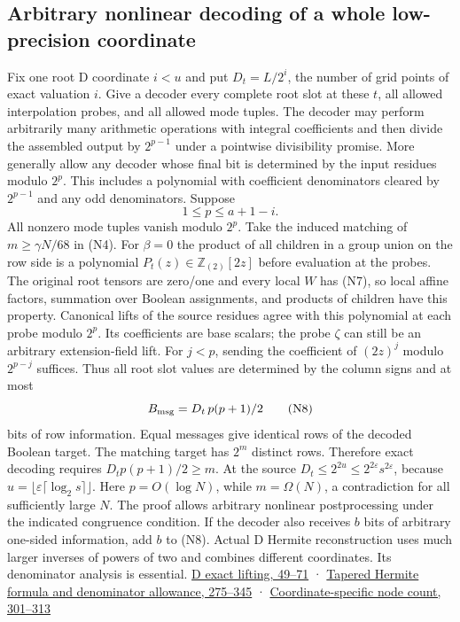 \documentclass[11pt,a4paper]{article}
\begin{document}
\subsection{Arbitrary nonlinear decoding of a whole low-precision
coordinate}\label{v8-arbitrary-nonlinear-decoding-of-a-whole-low-precision-coordinate}

Fix one root D coordinate \(i<u\) and put \(D_t=L/2^i\), the number of
grid points of exact valuation \(i\). Give a decoder every complete root
slot at these \(t\), all allowed interpolation probes, and all allowed
mode tuples. The decoder may perform arbitrarily many arithmetic
operations with integral coefficients and then divide the assembled
output by \(2^{p-1}\) under a pointwise divisibility promise. More
generally allow any decoder whose final bit is determined by the input
residues modulo \(2^p\). This includes a polynomial with coefficient
denominators cleared by \(2^{p-1}\) and any odd denominators. Suppose \[
 1\le p\le a+1-i.
\] All nonzero mode tuples vanish modulo \(2^p\). Take the induced
matching of \(m\ge \gamma N/68\) in (N4). For \(\beta=0\) the product of
all children in a group union on the row side is a polynomial
\(P_t(z)\in\mathbb Z_{(2)}[2z]\) before evaluation at the probes. The
original root tensors are zero/one and every local \(W\) has (N7), so
local affine factors, summation over Boolean assignments, and products
of children have this property. Canonical lifts of the source residues
agree with this polynomial at each probe modulo \(2^p\). Its
coefficients are base scalars; the probe \(\zeta\) can still be an
arbitrary extension-field lift. For \(j<p\), sending the coefficient of
\((2z)^j\) modulo \(2^{p-j}\) suffices. Thus all root slot values are
determined by the column signs and at most \[
 B_{\rm msg}=D_t\,p(p+1)/2
\tag{N8}
\] bits of row information. Equal messages give identical rows of the
decoded Boolean target. The matching target has \(2^m\) distinct rows.
Therefore exact decoding requires \(D_t p(p+1)/2\ge m\). At the source
\(D_t\le 2^{2u}\le 2^{2\varepsilon}s^{2\varepsilon}\), because
\(u=\lfloor\varepsilon\lceil\log_2 s\rceil\rfloor\). Here
\(p=O(\log N)\), while \(m=\Omega(N)\), a contradiction for all
sufficiently large \(N\). The proof allows arbitrary nonlinear
postprocessing under the indicated congruence condition. If the decoder
also receives \(b\) bits of arbitrary one-sided information, add \(b\)
to (N8). Actual D Hermite reconstruction uses much larger inverses of
powers of two and combines different coordinates. Its denominator
analysis is essential.
\href{https://github.com/openai/math/blob/main/preprints/The-Exponential-Time-Hypothesis-is-False-October-25-2026/build/quantitative-contraction.tex\#L49}{D
exact lifting, 49--71} ·
\href{https://github.com/openai/math/blob/main/preprints/The-Exponential-Time-Hypothesis-is-False-October-25-2026/build/quantitative-contraction.tex\#L275}{Tapered
Hermite formula and denominator allowance, 275--345} ·
\href{https://github.com/openai/math/blob/main/preprints/The-Exponential-Time-Hypothesis-is-False-October-25-2026/build/quantitative-contraction.tex\#L301}{Coordinate-specific
node count, 301--313}
\end{document}
